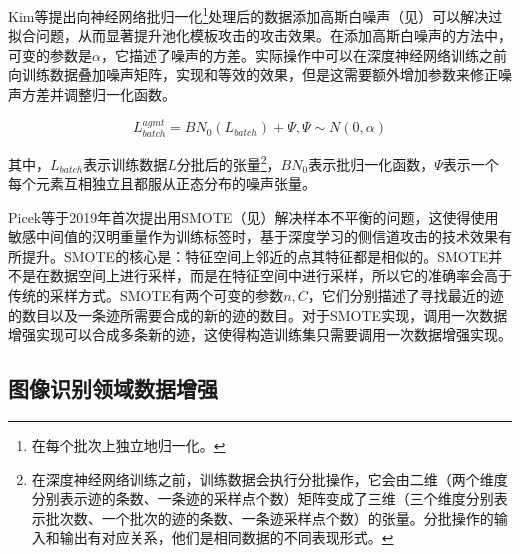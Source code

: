 {	Kim等\citep{Kim19}提出向神经网络批归一化\footnote{在每个批次上独立地归一化。}处理后的数据添加高斯白噪声（见）可以解决过拟合问题，从而显著提升池化模板攻击的攻击效果。在添加高斯白噪声的方法中，可变的参数是$\alpha$，它描述了噪声的方差。实际操作中可以在深度神经网络训练之前向训练数据叠加噪声矩阵，实现和等效的效果，但是这需要额外增加参数来修正噪声方差并调整归一化函数。
	
	\begin{equation}\label{eq:addnoise}
		 {L_{batch}^{agmt}}=BN_0(L_{batch})+\Psi,\Psi\sim N(0,\alpha)
	\end{equation}
	
	\noindent 其中，$L_{batch}$表示训练数据$L$分批后的张量\footnote{在深度神经网络训练之前，训练数据会执行分批操作，它会由二维（两个维度分别表示迹的条数、一条迹的采样点个数）矩阵变成了三维（三个维度分别表示批次数、一个批次的迹的条数、一条迹采样点个数）的张量。分批操作的输入和输出有对应关系，他们是相同数据的不同表现形式。}，$BN_0$表示批归一化函数，$\Psi$表示一个每个元素互相独立且都服从正态分布的噪声张量。
	
	Picek等\citep{Picek19}于2019年首次提出用SMOTE（见）解决样本不平衡的问题，这使得使用敏感中间值的汉明重量作为训练标签时，基于深度学习的侧信道攻击的技术效果有所提升。SMOTE的核心是：特征空间上邻近的点其特征都是相似的。SMOTE并不是在数据空间上进行采样，而是在特征空间中进行采样，所以它的准确率会高于传统的采样方式。SMOTE有两个可变的参数$n,C$，它们分别描述了寻找最近的迹的数目以及一条迹所需要合成的新的迹的数目。对于SMOTE实现，调用一次数据增强实现可以合成多条新的迹，这使得构造训练集只需要调用一次数据增强实现。
	
%	
	\subsection{图像识别领域数据增强}
	
}
